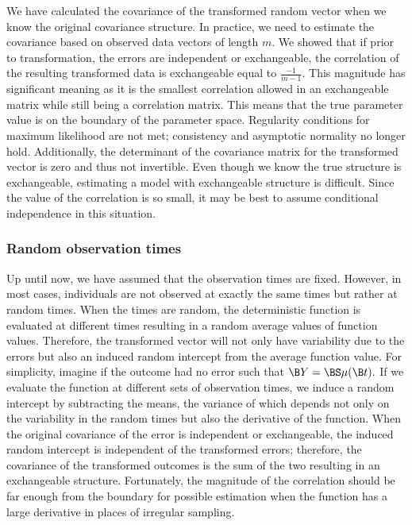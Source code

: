 We have calculated the covariance of the transformed random vector when we know the original covariance structure. In practice, we need to estimate the covariance based on observed data vectors of length $m$. We showed that if prior to transformation, the errors are independent or exchangeable, the correlation of the resulting transformed data is exchangeable equal to $\frac{-1}{m-1}$. This magnitude has significant meaning as it is the smallest correlation allowed in an exchangeable matrix while still being a correlation matrix. This means that the true parameter value is on the boundary of the parameter space. Regularity conditions for maximum likelihood are not met; consistency and asymptotic normality no longer hold. Additionally, the determinant of the covariance matrix for the transformed vector is zero and thus not invertible. Even though we know the true structure is exchangeable, estimating a model with exchangeable structure is difficult. Since the value of the correlation is so small, it may be best to assume conditional independence in this situation. 
 
\subsubsection{Random observation times} 
Up until now, we have assumed that the observation times are fixed. However, in most cases, individuals are not observed at exactly the same times but rather at random times. When the times are random, the deterministic function is evaluated at different times resulting in a random average values of function values. Therefore, the transformed vector will not only have variability due to the errors but also an induced random intercept from the average function value. For simplicity, imagine if the outcome had no error such that
$\B Y =  \BS\mu(\B t). $
If we evaluate the function at different sets of observation times, we induce a random intercept by subtracting the means, the variance of which depends not only on the variability in the random times but also the derivative of the function. When the original covariance of the error is independent or exchangeable, the induced random intercept is independent of the transformed errors; therefore, the covariance of the transformed outcomes is the sum of the two resulting in an exchangeable structure. Fortunately, the magnitude of the correlation should be far enough from the boundary for possible estimation when the function has a large derivative in places of irregular sampling.

